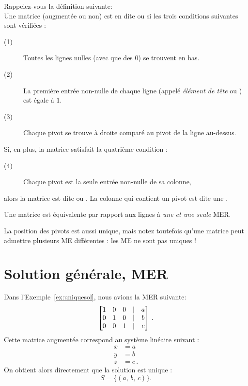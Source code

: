 Rappelez-vous la d\'efinition suivante:\\ 
Une matrice (augmentée ou non) est en dite  ou   si les trois conditions suivantes sont vérifiées :
\begin{description}
\item[(1)] Toutes les lignes nulles (avec que des $0$) se trouvent en bas.
\item[(2)] La première entrée non-nulle de chaque ligne (appelé \emph{\'el\'ement de t\^ete} ou ) est égale à $1$.
\item[(3)] Chaque pivot se trouve à droite comparé au pivot de la ligne au-dessus.
\end{description}
Si, en plus, la matrice satisfait la quatrième condition :
\begin{description}
\item[(4)] Chaque pivot est la seule entrée non-nulle de sa colonne,
\end{description}
alors la matrice est dite  ou .
La colonne qui contient un pivot est dite une .

\begin{theorem} 
Une matrice est équivalente par rapport aux lignes à 
\emph{une et une seule} MER.  
\end{theorem}

La position des pivots est aussi unique, mais 
notez toutefois qu'une matrice peut admettre plusieurs ME différentes : les ME ne sont pas uniques !

\section{Solution g\'en\'erale, MER}

\begin{myexample} Dans l'Exemple~\ref{ex:uniquesol}, nous avions la MER suivante:
$$
\left[ \begin{matrix} 1 & 0 & 0 &|& a\\
0 & 1 & 0 & | & b\\
0 & 0 & 1 & | & c \end{matrix} \right]\,.
$$
Cette matrice augmentée correspond au système linéaire suivant :
\begin{align*}
  x &= a\\
  y &=b\\
  z &= c \,.
\end{align*}  
On obtient alors directement que la solution est unique :
$$
S = \big\{ (a,\, b,\, c) \big\}.
$$
\end{myexample}

